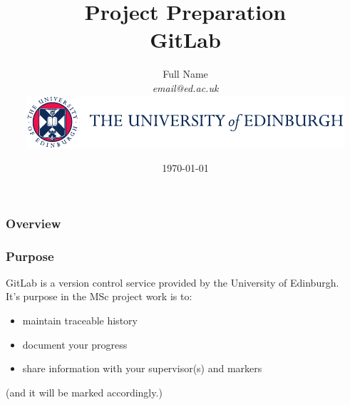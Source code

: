 \documentclass[xcolor=x11names,compress,usenames,dvipsnames,mathsans]{beamer}
\title[GitLab demo]{Project Preparation \\ GitLab}
\author[author]{Full Name \\
\textit{email@ed.ac.uk} \\
\vspace{1em}
\includegraphics[scale=.8]{logo_colour.pdf}
} %
\date{\today}
\begin{document}
\begin{frame}
\titlepage %

\end{frame}

\begin{frame}
\frametitle{Overview} %
\tableofcontents %
\end{frame}



\begin{frame}
\frametitle{Purpose}
\vfill
GitLab is a version control service provided by the University of Edinburgh. \\
\vfill
\pause
It's purpose in the MSc project work is to:
\begin{itemize}
	\item maintain traceable history
	\item document your progress
	\item share information with your supervisor(s) and markers
\end{itemize}
\pause
\vfill
(and it will be marked accordingly.)
\vfill
\end{frame}
\end{document}
